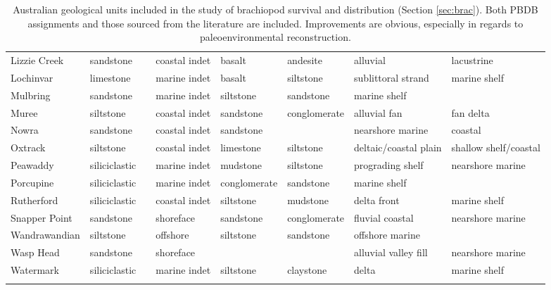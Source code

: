 \begin{sidewaystable}[ht]
\begin{tabular}{llllllll}
    Lizzie Creek & sandstone &  & coastal indet & basalt & andesite & alluvial & lacustrine \\ 
    Lochinvar & limestone &  & marine indet & basalt & siltstone & sublittoral strand & marine shelf \\ 
    Mulbring & sandstone &  & marine indet & siltstone & sandstone & marine shelf &  \\ 
    Muree & siltstone &  & coastal indet & sandstone & conglomerate & alluvial fan & fan delta \\ 
    Nowra & sandstone &  & coastal indet & sandstone &  & nearshore marine & coastal \\ 
    Oxtrack & siltstone &  & coastal indet & limestone & siltstone & deltaic/coastal plain & shallow shelf/coastal \\ 
    Peawaddy & siliciclastic &  & marine indet & mudstone & siltstone & prograding shelf & nearshore marine \\ 
    Porcupine & siliciclastic &  & marine indet & conglomerate & sandstone & marine shelf &  \\ 
    Rutherford & siliciclastic &  & coastal indet & siltstone & mudstone & delta front & marine shelf \\ 
    Snapper Point & sandstone &  & shoreface & sandstone & conglomerate & fluvial coastal & nearshore marine \\ 
    Wandrawandian & siltstone &  & offshore & siltstone & sandstone & offshore marine &  \\ 
    Wasp Head & sandstone &  & shoreface &  &  & alluvial valley fill & nearshore marine \\ 
    Watermark & siliciclastic &  & marine indet & siltstone & claystone & delta & marine shelf \\ 
    \hline
    \caption[Improvements to PBDB geological information]{Australian geological units included in the study of brachiopod survival and distribution (Section \ref{sec:brac}). Both PBDB assignments and those sourced from the literature are included. Improvements are obvious, especially in regards to paleoenvironmental reconstruction.}
    \label{tab:paleoenv}
  \end{tabular}
\end{sidewaystable}
